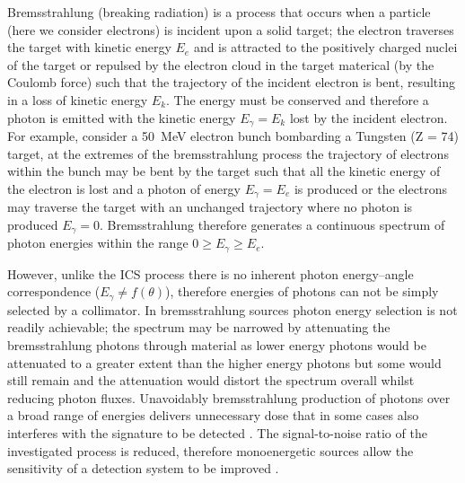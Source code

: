 \documentclass[../main.tex]{subfiles}
\begin{document}
Bremsstrahlung (breaking radiation) is a process that occurs when a particle (here we consider electrons) is incident upon a solid target; the electron traverses the target with kinetic energy $E_{e}$ and is attracted to the positively charged nuclei of the target or repulsed by the electron cloud in the target materical (by the Coulomb force) such that the trajectory of the incident electron is bent, resulting in a loss of kinetic energy $E_{k}$. The energy must be conserved and therefore a photon is emitted with the kinetic energy $E_{\gamma}=E_{k}$ lost by the incident electron. For example, consider a 50~\si{\mega\electronvolt} electron bunch bombarding a Tungsten (Z = 74) target, at the extremes of the bremsstrahlung process the trajectory of electrons within the bunch may be bent by the target such that all the kinetic energy of the electron is lost and a photon of energy $E_{\gamma}=E_{e}$ is produced or the electrons may traverse the target with an unchanged trajectory where no photon is produced $E_{\gamma}=0$. Bremsstrahlung therefore generates a continuous spectrum of photon energies within the range $0 \geq E_{\gamma} \geq E_{e}$.

However, unlike the ICS process there is no inherent photon energy--angle correspondence ($E_{\gamma}\neq f\left(\theta\right)$), therefore energies of photons can not be simply selected by a collimator. In bremsstrahlung sources photon energy selection is not readily achievable; the spectrum may be narrowed by attenuating the bremsstrahlung photons through material as lower energy photons would be attenuated to a greater extent than the higher energy photons but some would still remain and the attenuation would distort the spectrum overall whilst reducing photon fluxes. Unavoidably bremsstrahlung production of photons over a broad range of energies delivers unnecessary dose that in some cases also interferes with the signature to be detected \cite{geddes2017impact}. The signal-to-noise ratio of the investigated process is reduced, therefore monoenergetic sources allow the sensitivity of a detection system to be improved \cite{jones2008bremsstrahlung}.
\end{document}
